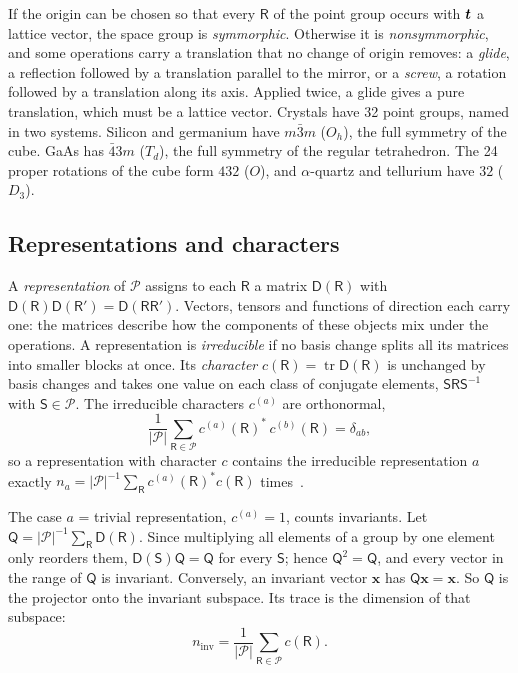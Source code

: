 If the origin can be chosen so that every $\mathsf{R}$ of the point group occurs with $\bm{t}$ a lattice vector, the space group is \emph{symmorphic}. Otherwise it is \emph{nonsymmorphic}, and some operations carry a translation that no change of origin removes: a \emph{glide}, a reflection followed by a translation parallel to the mirror, or a \emph{screw}, a rotation followed by a translation along its axis. Applied twice, a glide gives a pure translation, which must be a lattice vector. Crystals have 32 point groups, named in two systems. Silicon and germanium have $m\bar3m$ ($O_h$), the full symmetry of the cube. GaAs has $\bar43m$ ($T_d$), the full symmetry of the regular tetrahedron. The 24 proper rotations of the cube form $432$ ($O$), and $\alpha$-quartz and tellurium have $32$ ($D_3$).

\subsection{Representations and characters}

A \emph{representation} of $\mathcal{P}$ assigns to each $\mathsf{R}$ a matrix $\mathsf{D}(\mathsf{R})$ with $\mathsf{D}(\mathsf{R})\mathsf{D}(\mathsf{R}') = \mathsf{D}(\mathsf{R}\mathsf{R}')$. Vectors, tensors and functions of direction each carry one: the matrices describe how the components of these objects mix under the operations. A representation is \emph{irreducible} if no basis change splits all its matrices into smaller blocks at once. Its \emph{character} $c(\mathsf{R}) = \operatorname{tr}\mathsf{D}(\mathsf{R})$ is unchanged by basis changes and takes one value on each class of conjugate elements, $\mathsf{S}\mathsf{R}\mathsf{S}^{-1}$ with $\mathsf{S} \in \mathcal{P}$. The irreducible characters $c^{(a)}$ are orthonormal,
\begin{equation}
  \frac{1}{|\mathcal{P}|}\sum_{\mathsf{R}\in\mathcal{P}}c^{(a)}(\mathsf{R})^*\,c^{(b)}(\mathsf{R}) = \delta_{ab} ,
  \label{eq:C.17-orth}
\end{equation}
so a representation with character $c$ contains the irreducible representation $a$ exactly $n_a = |\mathcal{P}|^{-1}\sum_{\mathsf{R}}c^{(a)}(\mathsf{R})^*c(\mathsf{R})$ times~\cite[Chap.~3]{dresselhaus2008group}.

The case $a$ = trivial representation, $c^{(a)} = 1$, counts invariants. Let $\mathsf{Q} = |\mathcal{P}|^{-1}\sum_{\mathsf{R}}\mathsf{D}(\mathsf{R})$. Since multiplying all elements of a group by one element only reorders them, $\mathsf{D}(\mathsf{S})\mathsf{Q} = \mathsf{Q}$ for every $\mathsf{S}$; hence $\mathsf{Q}^2 = \mathsf{Q}$, and every vector in the range of $\mathsf{Q}$ is invariant. Conversely, an invariant vector $\mathbf{x}$ has $\mathsf{Q}\mathbf{x} = \mathbf{x}$. So $\mathsf{Q}$ is the projector onto the invariant subspace. Its trace is the dimension of that subspace:
\begin{equation}
  n_{\mathrm{inv}} = \frac{1}{|\mathcal{P}|}\sum_{\mathsf{R}\in\mathcal{P}}c(\mathsf{R}) .
  \label{eq:C.17-ninv}
\end{equation}


